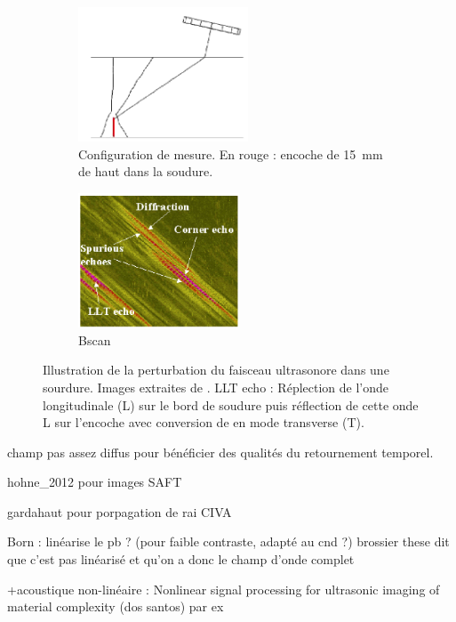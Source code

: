 \begin{figure}[!h]
    \centering
    \begin{subfigure}[c]{0.3\textwidth}
    	\centering
        \includegraphics[height=4cm]{img/chassignole_echos_config.png}
        \caption{Configuration de mesure. En rouge : encoche de 15~mm de haut dans la soudure.}
    \end{subfigure}
    \hspace{1cm}
    \begin{subfigure}[c]{0.3\textwidth}
    	\centering
        \includegraphics[height=4cm]{img/chassignole_echos.png}
        \caption{Bscan}
    \end{subfigure}
    \caption{Illustration de la perturbation du faisceau ultrasonore dans une sourdure. Images extraites de \cite{chassignole_beam}. LLT echo : Réplection de l'onde longitudinale (L) sur le bord de soudure puis réflection de cette onde L sur l'encoche avec conversion de en mode transverse (T).  }\label{echos}
\end{figure}


champ pas assez diffus pour bénéficier des qualités du retournement temporel.





\todo[inline]{}

hohne\_2012 pour images SAFT


gardahaut pour porpagation de rai CIVA

Born : linéarise le pb ? (pour faible contraste, adapté au cnd ?) brossier these dit que c'est pas linéarisé et qu'on a donc le champ d'onde complet

+acoustique non-linéaire : Nonlinear signal processing for ultrasonic imaging of material complexity (dos santos) par ex
